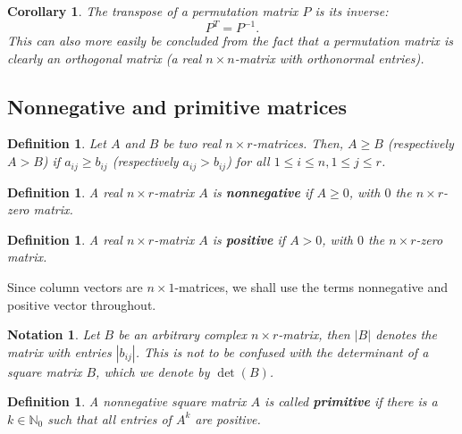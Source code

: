 \documentclass[a4paper,11pt]{report}
\newtheorem{definition}[theorem]{Definition}
\newtheorem{corollary}[theorem]{Corollary}
\newtheorem{notation}[theorem]{Notation}
\newcommand{\N}{{\mathbb N}}
\begin{document}
\begin{corollary}
  The transpose of a permutation matrix $P$ is its inverse:
  $$P^T = P^{-1}.$$
  This can also more easily be concluded from the fact that a permutation matrix 
  is clearly an orthogonal matrix (a real $n \times n$-matrix with orthonormal 
  entries).
\end{corollary}
\subsection{Nonnegative and primitive matrices}
\begin{definition}\label{groterkleiner}
  Let $A$ and $B$ be two real $n\times r$-matrices. Then, $A \geq B$ (respectively $A > B$) if $a_{ij} \geq b_{ij}$ 
  (respectively $a_{ij}>b_{ij}$) for all $1 \leq i \leq n, 1 \leq j\leq r$. 
\end{definition}
\begin{definition}  A real $n\times r$-matrix $A$ is \textbf{nonnegative} if $A \geq 0$, with $0$ the $n\times r$-zero matrix.
\end{definition}
\begin{definition}  A real $n\times r$-matrix $A$ is \textbf{positive} if $A > 0$, with $0$ the $n\times r$-zero matrix.
\end{definition}

Since column vectors are $n \times 1$-matrices, we shall use the terms 
nonnegative and positive vector throughout. 

\begin{notation}\label{modulusmatrix}
  Let $B$ be an arbitrary complex $n\times r$-matrix, then $|B|$ denotes the 
  matrix with entries $|b_{ij}|$. This is not to be confused with the 
  determinant of a square matrix $B$, which we denote by $\det(B)$.
\end{notation}

\begin{definition}  A nonnegative square matrix $A$ is called \textbf{primitive} if there is a $k \in \N_0$ such that all entries of $A^k$ are positive.
 \end{definition}
\end{document}
